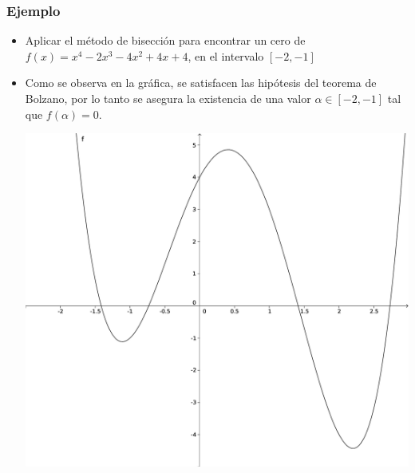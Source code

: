 \documentclass{beamer}
\begin{document}
\begin{frame}
  \frametitle{Ejemplo}
  \begin{itemize}
    \item<1-> Aplicar el m\'etodo de bisecci\'on para encontrar un cero de $f(x) = x^4 - 2x^3 - 4x^2 + 4x + 4$, en el intervalo $[-2, -1]$
    \item<2-> Como se observa en la gr\'afica, se satisfacen las hip\'otesis del teorema de Bolzano, por lo tanto se
    asegura la existencia de una valor $\alpha \in [-2,-1]$ tal que $f(\alpha)=0$.
    \begin{center}
      \includegraphics[scale=0.15]{./bisecc_f.eps}
    \end{center}
  \end{itemize}
\end{frame}
\end{document}
